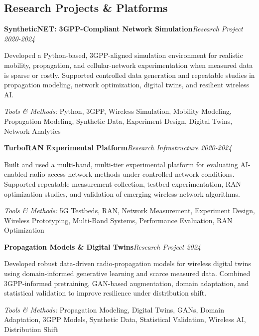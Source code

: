 \documentclass[9pt,letterpaper]{extarticle}
\newcommand{\entry}[2]{\Needspace{4\baselineskip}\textbf{#1}\hfill\textit{#2}\par}
\begin{document}
\subsection{Research Projects \& Platforms}
\entry{SyntheticNET: 3GPP-Compliant Network Simulation}{Research Project \textbar{} 2020-2024}
Developed a Python-based, 3GPP-aligned simulation environment for realistic mobility, propagation, and cellular-network experimentation when measured data is sparse or costly. Supported controlled data generation and repeatable studies in propagation modeling, network optimization, digital twins, and resilient wireless AI.\par
{\small\textit{Tools \& Methods:} Python, 3GPP, Wireless Simulation, Mobility Modeling, Propagation Modeling, Synthetic Data, Experiment Design, Digital Twins, Network Analytics\par}
\vspace{1pt}
\entry{TurboRAN Experimental Platform}{Research Infrastructure \textbar{} 2020-2024}
Built and used a multi-band, multi-tier experimental platform for evaluating AI-enabled radio-access-network methods under controlled network conditions. Supported repeatable measurement collection, testbed experimentation, RAN optimization studies, and validation of emerging wireless-network algorithms.\par
{\small\textit{Tools \& Methods:} 5G Testbeds, RAN, Network Measurement, Experiment Design, Wireless Prototyping, Multi-Band Systems, Performance Evaluation, RAN Optimization\par}
\vspace{1pt}
\entry{Propagation Models \& Digital Twins}{Research Project \textbar{} 2024}
Developed robust data-driven radio-propagation models for wireless digital twins using domain-informed generative learning and scarce measured data. Combined 3GPP-informed pretraining, GAN-based augmentation, domain adaptation, and statistical validation to improve resilience under distribution shift.\par
{\small\textit{Tools \& Methods:} Propagation Modeling, Digital Twins, GANs, Domain Adaptation, 3GPP Models, Synthetic Data, Statistical Validation, Wireless AI, Distribution Shift\par}
\vspace{1pt}
\end{document}
